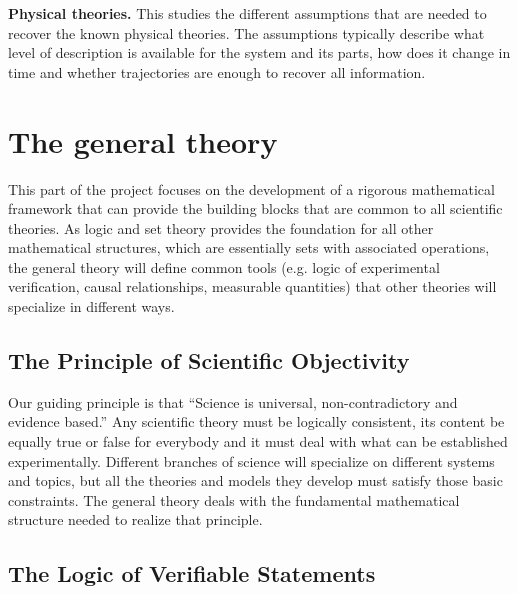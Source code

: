 \documentclass[twocolumn]{article}
\newif\ifextended
\newcommand\fact[2]{\ifextended \emph{#1}. #2 \fi}
\begin{document}
\textbf{Physical theories.} This studies the different assumptions that are needed to recover the known physical theories. The assumptions typically describe what level of description is available for the system and its parts, how does it change in time and whether trajectories are enough to recover all information.

\section{The general theory}

This part of the project focuses on the development of a rigorous mathematical framework that can provide the building blocks that are common to all scientific theories. As logic and set theory provides the foundation for all other mathematical structures, which are essentially sets with associated operations, the general theory will define common tools (e.g. logic of experimental verification, causal relationships, measurable quantities) that other theories will specialize in different ways.

\subsection{The Principle of Scientific Objectivity}

Our guiding principle is that ``Science is universal, non-contradictory and evidence based.'' Any scientific theory must be logically consistent, its content be equally true or false for everybody and it must deal with what can be established experimentally. Different branches of science will specialize on different systems and topics, but all the theories and models they develop must satisfy those basic constraints. The general theory deals with the fundamental mathematical structure needed to realize that principle. 

\fact{Not every subject can be studied by science} {The principle indirectly states that anything that is subjective, contradictory or not evidence based cannot be the subject of scientific investigation. The properties of prime numbers, moral and existential questions or the aesthetics of music fail in at least one of those respects and are excluded. Only the parts of nature that are accessible through consistent experimental verification can be studied scientifically. New experimental techniques have been extending that reach over time.}

\subsection{The Logic of Verifiable Statements}
\end{document}
